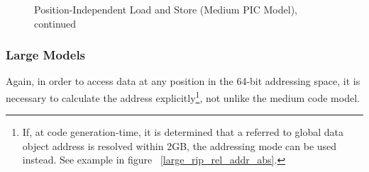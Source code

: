 \begin{figure}[H]
\Hrule
\caption{Position-Independent Load and Store (Medium PIC Model), continued}
\begin{center}
\end{center}
\Hrule
\end{figure}

\subsubsection{Large Models}

Again, in order to access data at any position in the 64-bit
addressing space, it is necessary to calculate the address
explicitly\footnote{ If, at code generation-time, it is
determined that a referred to global data object address is
resolved within 2GB, the  addressing
mode can be used instead. See example in figure~
\ref{large_rip_rel_addr_abs}.}, not unlike the medium code
model.

